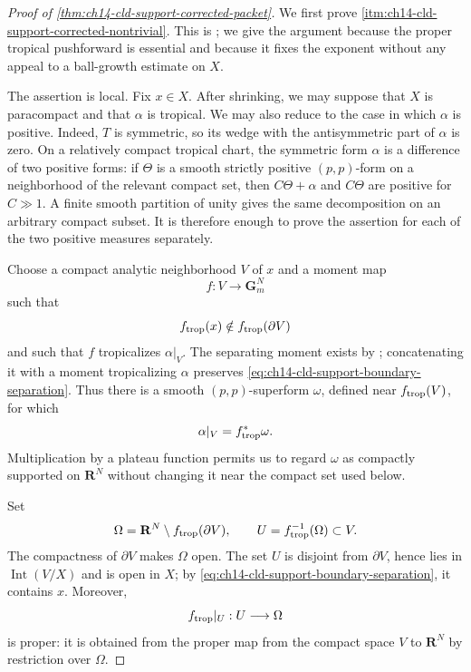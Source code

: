 
\begin{proof}[Proof of
\cref{thm:ch14-cld-support-corrected-packet}]
We first prove
\cref{itm:ch14-cld-support-corrected-nontrivial}.  This is
\cite[Theorem~16.8.5]{CLD25}; we give the argument because the proper
tropical pushforward is essential and because it fixes the exponent without
any appeal to a ball-growth estimate on $X$.

The assertion is local.  Fix $x\in X$.  After shrinking, we may suppose
that $X$ is paracompact and that $\alpha$ is tropical.  We may also reduce to
the case in which $\alpha$ is positive.  Indeed, $T$ is symmetric, so its
wedge with the antisymmetric part of $\alpha$ is zero.  On a relatively
compact tropical chart, the symmetric form $\alpha$ is a difference of two
positive forms: if $\Theta$ is a smooth strictly positive $(p,p)$-form on a
neighborhood of the relevant compact set, then
$C\Theta+\alpha$ and $C\Theta$ are positive for $C\gg1$.  A finite smooth
partition of unity gives the same decomposition on an arbitrary compact
subset.  It is therefore enough to prove the assertion for each of the two
positive measures separately.

Choose a compact analytic neighborhood $V$ of $x$ and a moment map
\[
                         f:V\longrightarrow\mathbf G_m^N
\]
such that
\begin{equation}
\label{eq:ch14-cld-support-boundary-separation}
                 f_{\mathrm{trop}}(x)\notin f_{\mathrm{trop}}(\partial V)
\end{equation}
and such that $f$ tropicalizes $\alpha|_V$.  The separating moment exists
by \cite[Lemma~12.3.6]{CLD25}; concatenating it with a moment tropicalizing
$\alpha$ preserves \eqref{eq:ch14-cld-support-boundary-separation}.  Thus
there is a smooth $(p,p)$-superform $\omega$, defined near
$f_{\mathrm{trop}}(V)$, for which
\begin{equation}
\label{eq:ch14-cld-support-alpha-tropical}
                         \alpha|_V=f_{\mathrm{trop}}^*\omega.
\end{equation}
Multiplication by a plateau function permits us to regard $\omega$ as
compactly supported on $\mathbf R^N$ without changing it near the compact
set used below.

Set
\begin{equation}
\label{eq:ch14-cld-support-omega-U}
 \Omega=\mathbf R^N\setminus f_{\mathrm{trop}}(\partial V),
 \qquad
 U=f_{\mathrm{trop}}^{-1}(\Omega)\subset V.
\end{equation}
The compactness of $\partial V$ makes $\Omega$ open.  The set $U$ is
disjoint from $\partial V$, hence lies in $\operatorname{Int}(V/X)$ and is
open in $X$; by \eqref{eq:ch14-cld-support-boundary-separation}, it contains
$x$.  Moreover,
\begin{equation}
\label{eq:ch14-cld-support-proper-tropicalization}
                     f_{\mathrm{trop}}|_U:U\longrightarrow\Omega
\end{equation}
is proper: it is obtained from the proper map from the compact space $V$ to
$\mathbf R^N$ by restriction over $\Omega$.


\end{proof}
